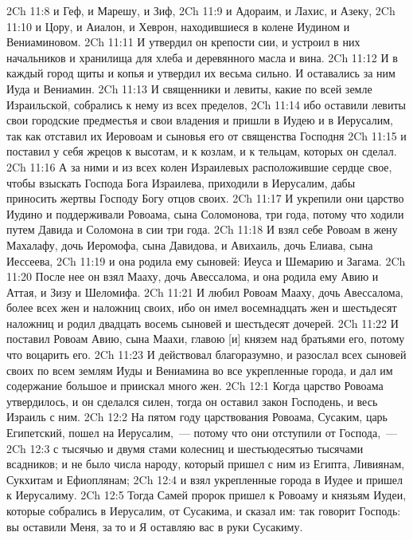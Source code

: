 \vs 2Ch 11:8 и Геф, и Марешу, и Зиф,
\vs 2Ch 11:9 и Адораим, и Лахис, и Азеку,
\vs 2Ch 11:10 и Цору, и Аиалон, и Хеврон, находившиеся в колене Иудином и Вениаминовом.
\vs 2Ch 11:11 И утвердил он крепости сии, и устроил в них начальников и хранилища для хлеба и деревянного масла и вина.
\vs 2Ch 11:12 И  в каждый город щиты и копья и утвердил их весьма сильно. И оставались за ним Иуда и Вениамин.
\rsbpar\vs 2Ch 11:13 И священники и левиты, какие  по всей земле Израильской, собрались к нему из всех пределов,
\vs 2Ch 11:14 ибо оставили левиты свои городские предместья и свои владения и пришли в Иудею и в Иерусалим, так как отставил их Иеровоам и сыновья его от священства Господня
\vs 2Ch 11:15 и поставил у себя жрецов к высотам, и к козлам, и к тельцам, которых он сделал.
\vs 2Ch 11:16 А за ними и из всех колен Израилевых расположившие сердце свое, чтобы взыскать Господа Бога Израилева, приходили в Иерусалим, дабы приносить жертвы Господу Богу отцов своих.
\vs 2Ch 11:17 И укрепили они царство Иудино и поддерживали Ровоама, сына Соломонова, три года, потому что ходили путем Давида и Соломона в сии три года.
\rsbpar\vs 2Ch 11:18 И взял себе Ровоам в жену Махалафу, дочь Иеромофа, сына Давидова, и Авихаиль, дочь Елиава, сына Иессеева,
\vs 2Ch 11:19 и она родила ему сыновей: Иеуса и Шемарию и Загама.
\vs 2Ch 11:20 После нее он взял Мааху, дочь Авессалома, и она родила ему Авию и Аттая, и Зизу и Шеломифа.
\vs 2Ch 11:21 И любил Ровоам Мааху, дочь Авессалома, более всех жен и наложниц своих, ибо он имел восемнадцать жен и шестьдесят наложниц и родил двадцать восемь сыновей и шестьдесят дочерей.
\vs 2Ch 11:22 И поставил Ровоам Авию, сына Маахи, главою [и] князем над братьями его, потому что  воцарить его.
\vs 2Ch 11:23 И действовал благоразумно, и разослал всех сыновей своих по всем землям Иуды и Вениамина во все укрепленные города, и дал им содержание большое и приискал много жен.
\vs 2Ch 12:1 Когда царство Ровоама утвердилось, и он сделался силен, тогда он оставил закон Господень, и весь Израиль с ним.
\rsbpar\vs 2Ch 12:2 На пятом году царствования Ровоама, Сусаким, царь Египетский, пошел на Иерусалим,~--- потому что они отступили от Господа,~---
\vs 2Ch 12:3 с тысячью и двумя стами колесниц и шестьюдесятью тысячами всадников; и не было числа народу, который пришел с ним из Египта, Ливиянам, Сукхитам и Ефиоплянам;
\vs 2Ch 12:4 и взял укрепленные города в Иудее и пришел к Иерусалиму.
\vs 2Ch 12:5 Тогда Самей пророк пришел к Ровоаму и князьям Иудеи, которые собрались в Иерусалим,  от Сусакима, и сказал им: так говорит Господь: вы оставили Меня, за то и Я оставляю вас в руки Сусакиму.
